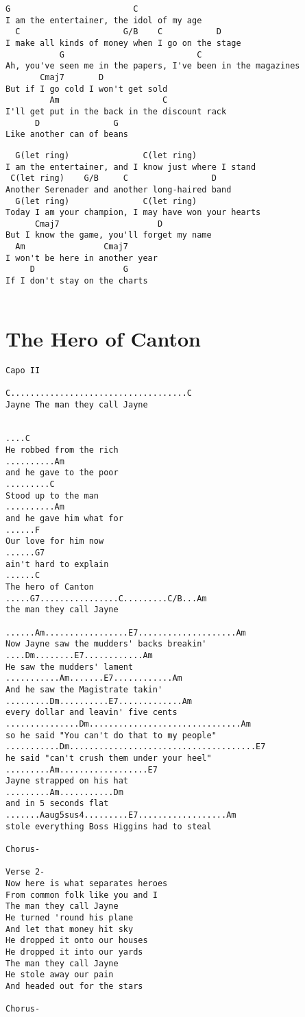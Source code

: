 \documentclass[leqno]{memoir}
\begin{document}
\begin{verbatim}
G                         C 
I am the entertainer, the idol of my age
  C                     G/B    C           D 
I make all kinds of money when I go on the stage
           G                           C
Ah, you've seen me in the papers, I've been in the magazines
       Cmaj7       D 
But if I go cold I won't get sold
         Am                     C
I'll get put in the back in the discount rack
      D               G
Like another can of beans
\end{verbatim}
\newpage
\begin{verbatim}
  G(let ring)               C(let ring)
I am the entertainer, and I know just where I stand
 C(let ring)    G/B     C                 D  
Another Serenader and another long-haired band
  G(let ring)               C(let ring)  
Today I am your champion, I may have won your hearts
      Cmaj7                    D
But I know the game, you'll forget my name
  Am                Cmaj7
I won't be here in another year
     D                  G 
If I don't stay on the charts


\end{verbatim}
\newpage\chapter{The Hero of Canton}
\begin{verbatim}
Capo II

C....................................C
Jayne The man they call Jayne
 

....C
He robbed from the rich
..........Am
and he gave to the poor
.........C
Stood up to the man
..........Am
and he gave him what for
......F
Our love for him now
......G7
ain't hard to explain
......C
The hero of Canton
.....G7................C.........C/B...Am
the man they call Jayne

......Am.................E7....................Am
Now Jayne saw the mudders' backs breakin'
....Dm........E7............Am
He saw the mudders' lament
...........Am.......E7............Am
And he saw the Magistrate takin'
.........Dm..........E7.............Am
every dollar and leavin' five cents
...............Dm...............................Am
so he said "You can't do that to my people"
...........Dm......................................E7
he said "can't crush them under your heel"
.........Am..................E7
Jayne strapped on his hat
.........Am...........Dm
and in 5 seconds flat
.......Aaug5sus4.........E7..................Am
stole everything Boss Higgins had to steal

Chorus-

Verse 2-
Now here is what separates heroes
From common folk like you and I
The man they call Jayne
He turned 'round his plane
And let that money hit sky
He dropped it onto our houses
He dropped it into our yards
The man they call Jayne
He stole away our pain
And headed out for the stars

Chorus-
\end{verbatim}
\newpage
\end{document}
